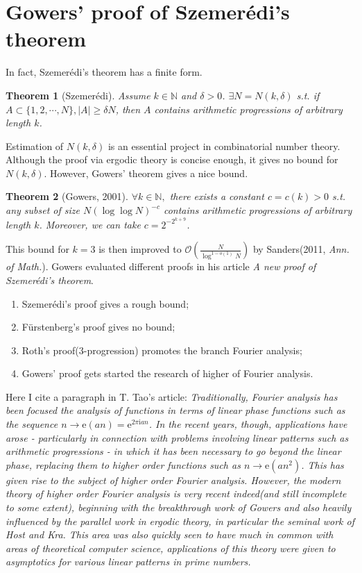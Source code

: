 \documentclass[12pt]{article}
\newtheorem{theorem}{Theorem}
\begin{document}
\section{Gowers' proof of Szemer\'edi's theorem}
In fact, Szemer\'edi's theorem has a finite form.
\begin{theorem}[Szemer\'edi]
Assume $k\in\mathbb N$ and $\delta>0$. $\exists N=N(k,\delta)$ s.t. if $A\subset\{1,2,\cdots,N \},|A|\ge \delta N$, then $A$ contains arithmetic progressions of arbitrary length $k$.
\end{theorem}
Estimation of $N(k,\delta)$ is an essential project in combinatorial number theory. Although the proof via ergodic theory is concise enough, it gives no bound for $N(k,\delta)$. However, Gowers' theorem  gives a nice bound.
\begin{theorem}[Gowers, 2001]
$\forall k\in \mathbb N,$ there exists a constant $c=c(k)>0$ s.t. any subset of size $N(\log\log N)^{-c}$ contains arithmetic progressions of arbitrary length $k$. Moreover, we can take $c=2^{-2^{k+9}}$.
\end{theorem}
This bound for $k=3$ is then improved to $\mathcal O\left(\frac{N}{\log^{1- o(1)}N} \right)$ by Sanders(2011, \textit{Ann. of Math.}). Gowers evaluated different proofs in his article \textit{A new proof of Szemer\'edi's theorem}.
\begin{enumerate}
	\item Szemer\'edi's proof gives a rough bound;
	\item F\"urstenberg's proof gives no bound;
	\item Roth's proof(3-progression) promotes the branch Fourier analysis;
	\item Gowers' proof gets started the research of higher of Fourier analysis.
\end{enumerate}
Here I cite a paragraph in T. Tao's article: \textit{Traditionally, Fourier analysis has been focused the analysis of functions in terms of linear phase functions such as the sequence $n\to \mathrm e(an)=\mathrm e^{2\pi \mathrm i an}$. In the recent years, though, applications have arose - particularly in connection with problems involving linear patterns such as arithmetic progressions - in which it has been necessary to go beyond the linear phase, replacing them to higher order functions such as $n\to \mathrm e(an^2)$. This has given rise to the subject of higher order Fourier analysis. However, the modern theory of higher order Fourier analysis is very recent indeed(and still incomplete to some extent), beginning with the breakthrough work of Gowers and also heavily influenced by the parallel work in ergodic theory, in particular the seminal work of Host and Kra. This area was also quickly seen to have much in common with areas of theoretical computer science, applications of this theory were given to asymptotics for various linear patterns in prime numbers.}
\end{document}
